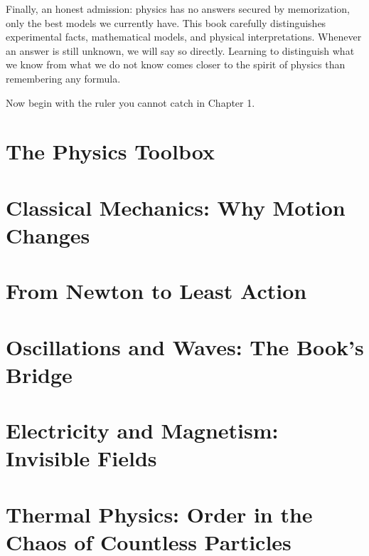 \documentclass[fontset=fandol,12pt,openany]{ctexbook}
\begin{document}
Finally, an honest admission: physics has no answers secured by memorization, only the best models we currently have. This book carefully distinguishes experimental facts, mathematical models, and physical interpretations. Whenever an answer is still unknown, we will say so directly. Learning to distinguish what we know from what we do not know comes closer to the spirit of physics than remembering any formula.

Now begin with the ruler you cannot catch in Chapter 1.

\tableofcontents
\mainmatter

\part{The Physics Toolbox}




\part{Classical Mechanics: Why Motion Changes}








\part{From Newton to Least Action}



\part{Oscillations and Waves: The Book's Bridge}



\part{Electricity and Magnetism: Invisible Fields}







\part{Thermal Physics: Order in the Chaos of Countless Particles}







\end{document}
